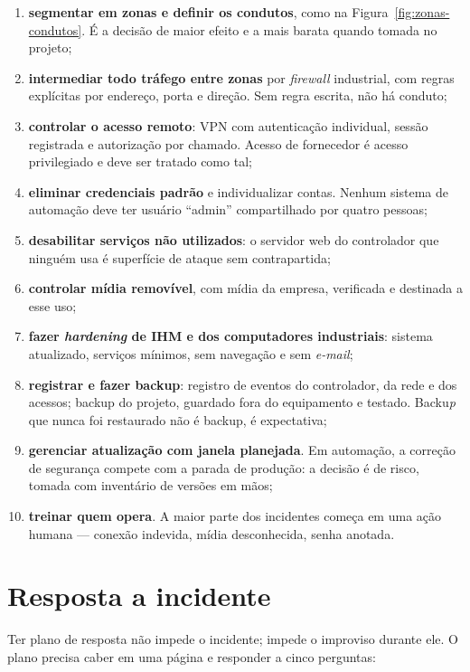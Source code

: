 \begin{enumerate}
  \item \textbf{segmentar em zonas e definir os condutos}, como na Figura~\ref{fig:zonas-condutos}. É a
        decisão de maior efeito e a mais barata quando tomada no projeto;
  \item \textbf{intermediar todo tráfego entre zonas} por \emph{firewall} industrial, com regras
        explícitas por endereço, porta e direção. Sem regra escrita, não há conduto;
  \item \textbf{controlar o acesso remoto}: VPN com autenticação individual, sessão registrada e
        autorização por chamado. Acesso de fornecedor é acesso privilegiado e deve ser tratado como
        tal;
  \item \textbf{eliminar credenciais padrão} e individualizar contas. Nenhum sistema de automação
        deve ter usuário ``admin'' compartilhado por quatro pessoas;
  \item \textbf{desabilitar serviços não utilizados}: o servidor web do controlador que ninguém usa é
        superfície de ataque sem contrapartida;
  \item \textbf{controlar mídia removível}, com mídia da empresa, verificada e destinada a esse uso;
  \item \textbf{fazer \emph{hardening} de IHM e dos computadores industriais}: sistema atualizado,
        serviços mínimos, sem navegação e sem \emph{e-mail};
  \item \textbf{registrar e fazer backup}: registro de eventos do controlador, da rede e dos acessos;
        backup do projeto, guardado fora do equipamento e testado. Backu\emph{p} que nunca foi
        restaurado não é backup, é expectativa;
  \item \textbf{gerenciar atualização com janela planejada}. Em automação, a correção de segurança
        compete com a parada de produção: a decisão é de risco, tomada com inventário de versões em
        mãos;
  \item \textbf{treinar quem opera}. A maior parte dos incidentes começa em uma ação humana ---
        conexão indevida, mídia desconhecida, senha anotada.
\end{enumerate}

\section{Resposta a incidente}

Ter plano de resposta não impede o incidente; impede o improviso durante ele. O plano precisa caber
em uma página e responder a cinco perguntas:

